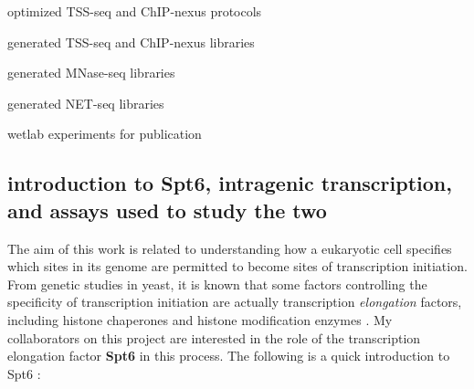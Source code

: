 \documentclass[9pt, letterpaper]{article}
\begin{document}
\begin{description}[align=right, labelwidth=5cm, noitemsep]
    \item [Steve Doris] optimized TSS-seq and ChIP-nexus protocols
    \item [] generated TSS-seq and ChIP-nexus libraries
    \item [Olga Viktorovskaya] generated MNase-seq libraries
    \item [Magdalenda Murawska] generated NET-seq libraries
    \item [Dan Spatt] wetlab experiments for publication
\end{description}

\subsection{introduction to Spt6, intragenic transcription, and assays used to study the two}

The aim of this work is related to understanding how a eukaryotic cell specifies which sites in its genome are permitted to become sites of transcription initiation. From genetic studies in yeast, it is known that some factors controlling the specificity of transcription initiation are actually transcription \textit{elongation} factors, including histone chaperones and histone modification enzymes \cite{kaplan2003, cheung2008, hennig2013}. My collaborators on this project are interested in the role of the transcription elongation factor \textbf{Spt6} in this process. The following is a quick introduction to Spt6 \cite{doris2018}:
\end{document}
